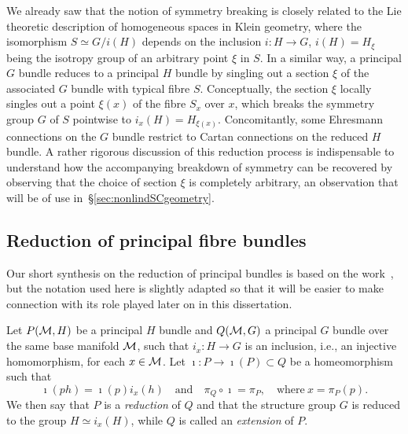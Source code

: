 \documentclass[
final,
11pt,
a4paper,
DIV=11,
headinclude=true,
footinclude=false,
bibliography=totoc,
twoside=true,  %
BCOR=5mm
]{scrbook}
\begin{document}
We already saw that the notion of symmetry breaking is closely 
related to the Lie theoretic description of homogeneous spaces in 
Klein geometry, where the isomorphism $S \simeq G/i(H)$ depends 
on the inclusion $i : H \to G$, $i(H) = H_\xi$ being the isotropy 
group of an arbitrary point $\xi$ in $S$. In a similar way, a 
principal $G$ bundle reduces to a principal $H$ bundle by 
singling out a section $\xi$ of the associated $G$ bundle with 
typical fibre $S$. Conceptually, the section $\xi$ locally 
singles out a point $\xi(x)$ of the fibre $S_x$ over $x$, which 
breaks the symmetry group $G$ of $S$ pointwise to $i_x(H) = 
H_{\xi(x)}$.  Concomitantly, some Ehresmann connections on the 
$G$ bundle restrict to Cartan connections on the reduced $H$ 
bundle.  A rather rigorous discussion of this reduction process 
is indispensable to understand how the accompanying breakdown of 
symmetry can be recovered by observing that the choice of section 
$\xi$ is completely arbitrary, an observation that will be of use 
in~\S\ref{sec:nonlindSCgeometry}.

\subsection{Reduction of principal fibre bundles}
\label{ssec:reduction_bundle}

Our short synthesis on the reduction of principal bundles is 
based on the work~\cite{kob1996found, husemoller:1966fibre, 
  husemoller.etal:2008bbt}, but the notation used here is 
slightly adapted so that it will be easier to make connection 
with its role played later on in this dissertation.

\begin{definition}
Let $P(\mathcal{M},H)$ be a principal $H$ bundle and $Q(\mathcal{M},G)$ a 
principal $G$ bundle over the same base manifold $\mathcal{M}$, such 
that $i_x : H \to G$ is an inclusion, i.e., an injective 
homomorphism, for each $x \in \mathcal{M}$.  Let $\imath : P \to 
\imath(P) \subset Q$ be a homeomorphism such that
\begin{equation*}
  \imath(ph) = \imath(p) i_x(h)
  \quad\text{and}\quad
  \pi_Q \circ \imath = \pi_P,
  \quad\text{where}~%
  x = \pi_P(p).
\end{equation*}
We then say that $P$ is a \emph{reduction} of $Q$ and that the 
structure group $G$ is reduced to the group $H \simeq i_x(H)$, 
while $Q$ is called an \emph{extension} of $P$.
\end{definition}
\end{document}
